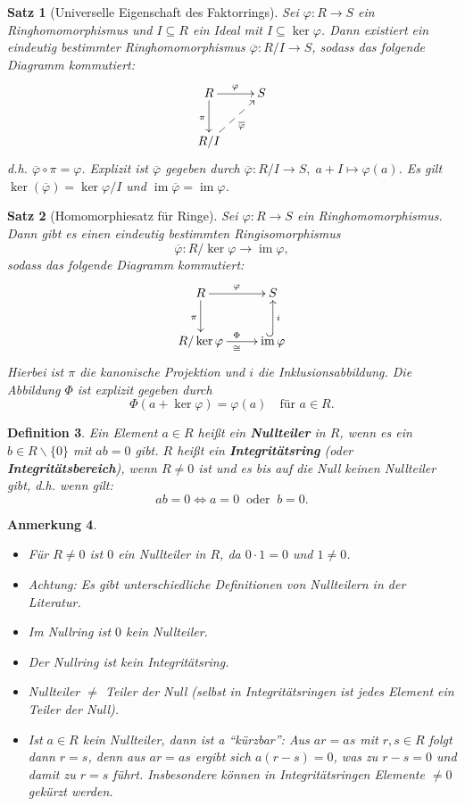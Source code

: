 \documentclass[a4paper, twoside, 11pt, ngerman]{report}
\renewcommand{\setminus}{\smallsetminus}
\DeclareMathOperator{\image}{im}
\theoremstyle{definistyle}
\newtheorem{satz}{Satz}[section]
\newtheorem{defini}[satz]{Definition}
\newtheorem{anm}[satz]{Anmerkung}
\theoremstyle{remark}
\newcommand{\defn}[1]{\textit{\bfseries #1}}
\begin{document}
\begin{satz}[Universelle Eigenschaft des Faktorrings]\label{satz:faktorring_universelle_eigenschaft}
 Sei $\varphi \colon R \to S$ ein Ringhomomorphismus und $I \subseteq R$ ein Ideal mit $I \subseteq \ker \varphi$. Dann existiert ein eindeutig bestimmter Ringhomomorphismus $\overline{\varphi} \colon R / I \to S$, sodass das folgende Diagramm kommutiert:
\[
\xymatrix{
R \ar[r]^{\varphi} \ar[d]_{\pi} & S \\
R / I \ar@{-->}[ur]_{\overline{\varphi}}
}
\]
d.h. $\overline{\varphi} \circ \pi = \varphi$. Explizit ist $\overline{\varphi}$ gegeben durch $\overline{\varphi} \colon R / I \to S, \; a + I \mapsto \varphi(a)$. Es gilt $\ker(\overline{\varphi}) = \ker \varphi / I$ und $\image \overline{\varphi} = \image \varphi$.
\end{satz}

\begin{satz}[Homomorphiesatz für Ringe]\label{satz:homomorphiesatz_ring}
Sei $\varphi \colon R \to S$ ein Ringhomomorphismus. Dann gibt es einen eindeutig bestimmten Ringisomorphismus
\[
\overline{\varphi} \colon R / \ker \varphi \to \image \varphi,
\]
sodass das folgende Diagramm kommutiert:
\[
\xymatrix{
R \ar[r]^{\varphi} \ar[d]_{\pi} & S \\
R / \ker \varphi  \ar[r]^\Phi_{\cong} & \image \varphi \ar@{^{(}->}[u]_{i}
}
\]
Hierbei ist $\pi$ die kanonische Projektion und $i$ die Inklusionsabbildung. Die Abbildung $\Phi$ ist explizit gegeben durch
\[
\Phi(a + \ker \varphi) = \varphi(a) \quad \text{für } a \in R.
\]
\end{satz}

\begin{defini}\label{def:nullteiler_integritätsring}
Ein Element $a \in R$ heißt ein \defn{Nullteiler} in $R$, wenn es ein $b \in R\setminus\{0\}$ mit $a b = 0$ gibt. $R$ heißt ein \defn{Integritätsring} (oder \defn{Integritätsbereich}), wenn $R \neq 0$ ist und es bis auf die Null keinen Nullteiler gibt, d.h. wenn gilt:
\[
ab=0\iff a=0 \ \text{ oder } \ b=0.
\]
\end{defini}

\begin{anm}\label{anm:nullteiler}
\begin{itemize}
    \item Für $R \neq 0$ ist $0$ ein Nullteiler in $R$, da $0 \cdot 1 = 0$ und $1 \neq 0$.
    \item Achtung: Es gibt unterschiedliche Definitionen von Nullteilern in der Literatur.
    \item Im Nullring ist $0$ kein Nullteiler.
    \item Der Nullring ist kein Integritätsring.
    \item Nullteiler $\neq$ Teiler der Null (selbst in Integritätsringen ist jedes Element ein Teiler der Null).
    \item Ist $a\in R$ kein Nullteiler, dann ist a "`kürzbar"': Aus $ar=as$ mit $r,s\in R$ folgt dann $r=s$, denn aus $ar=as$ ergibt sich $a(r-s)=0$, was zu $r-s=0$ und damit zu $r=s$ führt.
    Insbesondere können in Integritätsringen Elemente $\neq0$ gekürzt werden. 
\end{itemize}
\end{anm}
\end{document}
